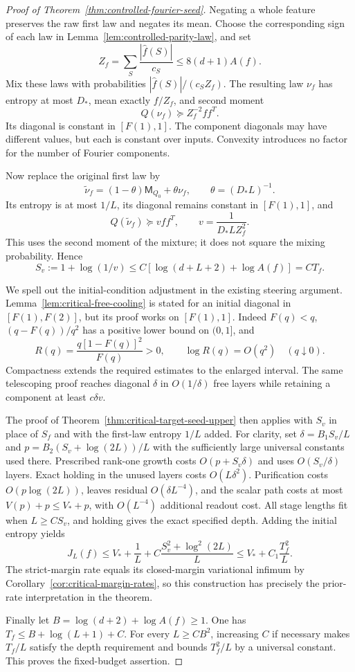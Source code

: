\begin{proof}[Proof of Theorem~\ref{thm:controlled-fourier-seed}]
Negating a whole feature preserves the raw first law and negates its
mean. Choose the corresponding sign of each law in
Lemma~\ref{lem:controlled-parity-law}, and set
\[
 Z_f=\sum_S\frac{|\widehat f(S)|}{c_S}
       \le8(d+1)A(f).
\]
Mix these laws with probabilities
$|\widehat f(S)|/(c_SZ_f)$. The resulting law $\nu_f$ has entropy
at most $D_*$, mean exactly $f/Z_f$, and second moment
\[
 Q(\nu_f)\succeq Z_f^{-2}ff^T.
\]
Its diagonal is constant in $[F(1),1]$. The component diagonals may
have different values, but each is constant over inputs. Convexity
introduces no factor for the number of Fourier components.

Now replace the original first law by
\[
 \widetilde\nu_f=(1-\theta)\mathsf M_{Q_0}+\theta\nu_f,
 \qquad \theta=(D_*L)^{-1}.
\]
Its entropy is at most $1/L$, its diagonal remains constant in
$[F(1),1]$, and
\[
 Q(\widetilde\nu_f)\succeq vff^T,
 \qquad v=\frac1{D_*LZ_f^2}.
\]
This uses the second moment of the mixture; it does not square the
mixing probability. Hence
\[
 S_v:=1+\log(1/v)\le C[\log(d+L+2)+\log A(f)]=CT_f.
\]

We spell out the initial-condition adjustment in the existing steering
argument. Lemma~\ref{lem:critical-free-cooling} is stated for an
initial diagonal in $[F(1),F(2)]$, but its proof works on $[F(1),1]$.
Indeed $F(q)<q$, $(q-F(q))/q^2$ has a positive lower bound on $(0,1]$,
and
\[
 R(q)=\frac{q[1-F(q)]^2}{F(q)}>0,
 \qquad \log R(q)=O(q^2)\quad(q\downarrow0).
\]
Compactness extends the required estimates to the enlarged interval.
The same telescoping proof reaches diagonal $\delta$ in $O(1/\delta)$
free layers while retaining a component at least $c\delta v$.

The proof of Theorem~\ref{thm:critical-target-seed-upper} then applies
with $S_v$ in place of $S_f$ and with the first-law entropy $1/L$
added. For clarity, set $\delta=B_1S_v/L$ and
$p=B_2(S_v+\log(2L))/L$ with the sufficiently large universal constants
used there. Prescribed rank-one growth costs $O(p+S_v\delta)$ and
uses $O(S_v/\delta)$ layers. Exact holding in the unused layers
costs $O(L\delta^2)$. Purification costs $O(p\log(2L))$, leaves
residual $O(\delta L^{-4})$, and the scalar path costs at most
$V(p)+p\le V_*+p$, with $O(L^{-4})$ additional readout cost.
All stage lengths fit when $L\ge CS_v$, and holding gives the exact
specified depth. Adding the initial entropy yields
\[
 J_L(f)\le V_*+\frac1L+
 C\frac{S_v^2+\log^2(2L)}L
 \le V_*+C_1\frac{T_f^2}L.
\]
The strict-margin rate equals its closed-margin variational infimum
by Corollary~\ref{cor:critical-margin-rates}, so this construction
has precisely the prior-rate interpretation in the theorem.

Finally let $B=\log(d+2)+\log A(f)\ge1$.
One has $T_f\le B+\log(L+1)+C$. For every $L\ge CB^2$, increasing
$C$ if necessary makes $T_f/L$ satisfy the depth requirement and
bounds $T_f^2/L$ by a universal constant. This proves the fixed-budget
assertion.
\end{proof}

